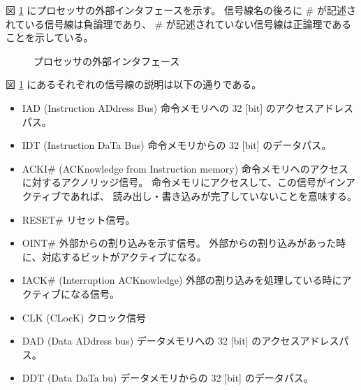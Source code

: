 \documentclass[../specifications.tex]{subfiles}
\begin{document}
  図 \ref{fig:external-interface} にプロセッサの外部インタフェースを示す。
  信号線名の後ろに \# が記述されている信号線は負論理であり、
  \# が記述されていない信号線は正論理であることを示している。

  \begin{figure}
    \centering
    \caption{プロセッサの外部インタフェース}
    \label{fig:external-interface}
  \end{figure}

  図 \ref{fig:external-interface} にあるそれぞれの信号線の説明は以下の通りである。
  \begin{itemize}
    \item IAD (Instruction ADdress Bus)
    \newline 命令メモリへの 32 [bit] のアクセスアドレスパス。

    \item IDT (Instruction DaTa Bus)
    \newline 命令メモリからの 32 [bit] のデータパス。

    \item ACKI\# (ACKnowledge from Instruction memory)
    \newline 命令メモリへのアクセスに対するアクノリッジ信号。
    命令メモリにアクセスして、この信号がインアクティブであれば、
    読み出し・書き込みが完了していないことを意味する。
    
    \item RESET\#
    \newline リセット信号。

    \item OINT\#
    \newline 外部からの割り込みを示す信号。
    外部からの割り込みがあった時に、対応するビットがアクティブになる。

    \item IACK\# (Interruption ACKnowledge)
    \newline 外部の割り込みを処理している時にアクティブになる信号。

    \item CLK (CLocK)
    \newline クロック信号

    \item DAD (Data ADdress bus)
    \newline データメモリへの 32 [bit] のアクセスアドレスパス。

    \item DDT (Data DaTa bu)
    \newline データメモリからの 32 [bit] のデータパス。


\end{itemize}
\end{document}
